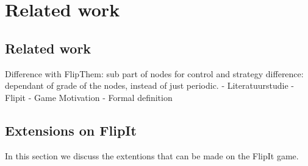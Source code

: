 \chapter{Related work}
\label{cha:1}



\section{Related work}

Difference with FlipThem: sub part of nodes for control and strategy difference: dependant of grade of the nodes, instead of just periodic.
- Literatuurstudie
- Flipit
- Game Motivation
- Formal definition

\section{Extensions on FlipIt}

In this section we discuss the extentions that can be made on the FlipIt game. \\


